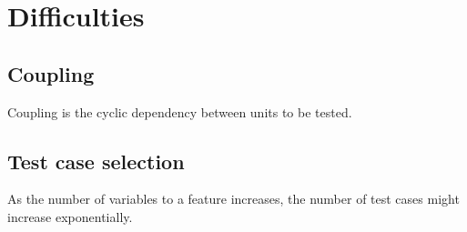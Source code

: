 \section{Difficulties}

\subsection{Coupling}
Coupling is the cyclic dependency between units to be tested.

\subsection{Test case selection}
As the number of variables to a feature increases, the number of test cases might increase exponentially.
